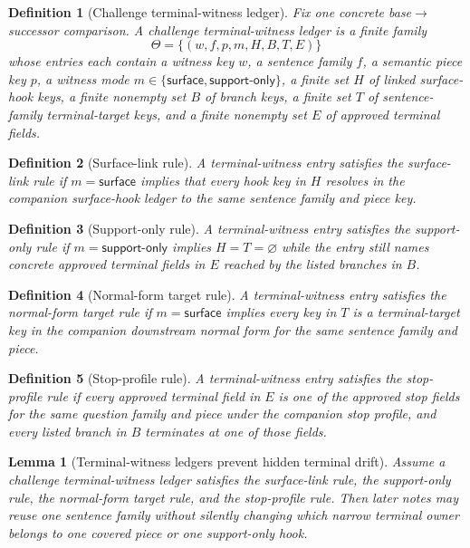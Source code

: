\documentclass[11pt]{article}
\newtheorem{definition}{Definition}
\newtheorem{lemma}{Lemma}
\begin{document}
\begin{definition}[Challenge terminal-witness ledger]
Fix one concrete base$\to$successor comparison.
A \emph{challenge terminal-witness ledger} is a finite family
\[
\Theta=\{(w,f,p,m,H,B,T,E)\}
\]
whose entries each contain a witness key $w$, a sentence family $f$, a semantic piece key $p$, a witness mode $m\in\{\textsf{surface},\textsf{support-only}\}$, a finite set $H$ of linked surface-hook keys, a finite nonempty set $B$ of branch keys, a finite set $T$ of sentence-family terminal-target keys, and a finite nonempty set $E$ of approved terminal fields.
\end{definition}

\begin{definition}[Surface-link rule]
A terminal-witness entry satisfies the \emph{surface-link rule} if $m=\textsf{surface}$ implies that every hook key in $H$ resolves in the companion surface-hook ledger to the same sentence family and piece key.
\end{definition}

\begin{definition}[Support-only rule]
A terminal-witness entry satisfies the \emph{support-only rule} if $m=\textsf{support-only}$ implies $H=T=\varnothing$ while the entry still names concrete approved terminal fields in $E$ reached by the listed branches in $B$.
\end{definition}

\begin{definition}[Normal-form target rule]
A terminal-witness entry satisfies the \emph{normal-form target rule} if $m=\textsf{surface}$ implies every key in $T$ is a terminal-target key in the companion downstream normal form for the same sentence family and piece.
\end{definition}

\begin{definition}[Stop-profile rule]
A terminal-witness entry satisfies the \emph{stop-profile rule} if every approved terminal field in $E$ is one of the approved stop fields for the same question family and piece under the companion stop profile, and every listed branch in $B$ terminates at one of those fields.
\end{definition}

\begin{lemma}[Terminal-witness ledgers prevent hidden terminal drift]
Assume a challenge terminal-witness ledger satisfies the surface-link rule, the support-only rule, the normal-form target rule, and the stop-profile rule.
Then later notes may reuse one sentence family without silently changing which narrow terminal owner belongs to one covered piece or one support-only hook.
\end{lemma}
\end{document}
